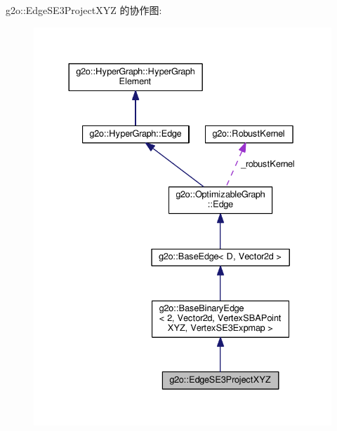 g2o\-:\-:Edge\-S\-E3\-Project\-X\-Y\-Z 的协作图\-:
\nopagebreak
\begin{figure}[H]
\begin{center}
\leavevmode
\includegraphics[width=333pt]{classg2o_1_1EdgeSE3ProjectXYZ__coll__graph}
\end{center}
\end{figure}
